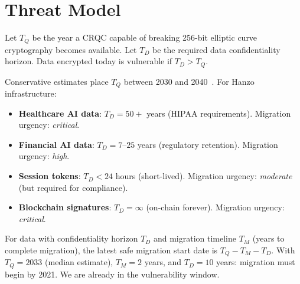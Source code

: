 \section{Threat Model}

\label{sec:threat}

\begin{definition}
Let $T_Q$ be the year a CRQC capable of breaking 256-bit elliptic curve
cryptography becomes available. Let $T_D$ be the required data confidentiality
horizon. Data encrypted today is vulnerable if $T_D > T_Q$.
\end{definition}

Conservative estimates place $T_Q$ between 2030 and
2040~\cite{quantumtimeline}. For Hanzo infrastructure:
\begin{itemize}[leftmargin=1.1em]
    \item \textbf{Healthcare AI data}: $T_D = 50+$ years (HIPAA requirements).
    Migration urgency: \emph{critical}.
    \item \textbf{Financial AI data}: $T_D = 7$--$25$ years (regulatory
    retention). Migration urgency: \emph{high}.
    \item \textbf{Session tokens}: $T_D < 24$ hours (short-lived). Migration
    urgency: \emph{moderate} (but required for compliance).
    \item \textbf{Blockchain signatures}: $T_D = \infty$ (on-chain forever).
    Migration urgency: \emph{critical}.
\end{itemize}

\begin{theorem}
For data with confidentiality horizon $T_D$ and migration timeline $T_M$
(years to complete migration), the latest safe migration start date is
$T_Q - T_M - T_D$. With $T_Q = 2033$ (median estimate), $T_M = 2$ years,
and $T_D = 10$ years: migration must begin by 2021. We are already in the
vulnerability window.
\end{theorem}


